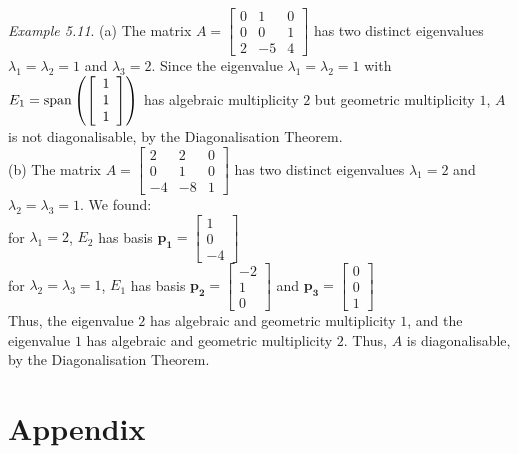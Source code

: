 \documentclass[
  letterpaper,
  DIV=11,
  numbers=noendperiod]{scrartcl}
\theoremstyle{remark}
\begin{document}
\emph{Example 5.11}. (a) The matrix \(A = \left[\begin{array}{ccc}
        0 & 1 & 0 \\ 0 & 0 & 1 \\ 2 & -5 & 4 \end{array}\right]\) has
two distinct eigenvalues \(\lambda _{1} = \lambda _{2} = 1\) and
\(\lambda _{3} = 2\). Since the eigenvalue
\(\lambda _{1} = \lambda _{2} = 1\) with
\(E_{1} = {\rm span}\left(\left[\begin{array}{c} 1 \\ 1 \\ 1 \end{array}\right]\right)\)
has algebraic multiplicity \(2\) but geometric multiplicity \(1\), \(A\)
is not diagonalisable, by the Diagonalisation Theorem.\\
(b) The matrix \(A = \left[\begin{array}{ccc}
        2 & 2 & 0 \\ 0 & 1 & 0 \\ -4 & -8 & 1 \end{array}\right]\) has
two distinct eigenvalues \(\lambda _{1} = 2\) and
\(\lambda _{2} = \lambda _{3} = 1\). We found:\\
for \(\lambda _{1} = 2\), \(E_{2}\) has basis
\(\mathbf{p_{1}} = \left[\begin{array}{c} 1 \\ 0 \\ -4 \end{array}\right]\)\\
for \(\lambda _{2} = \lambda _{3} = 1\), \(E_{1}\) has basis
\(\mathbf{p_{2}} = \left[\begin{array}{c} -2 \\ 1 \\ 0 \end{array}\right]\)
and
\(\mathbf{p_{3}} = \left[\begin{array}{c} 0 \\ 0 \\ 1 \end{array}\right]\)\\
Thus, the eigenvalue \(2\) has algebraic and geometric multiplicity
\(1\), and the eigenvalue \(1\) has algebraic and geometric multiplicity
\(2\). Thus, \(A\) is diagonalisable, by the Diagonalisation Theorem.

\section{Appendix}\label{appendix}
\end{document}
